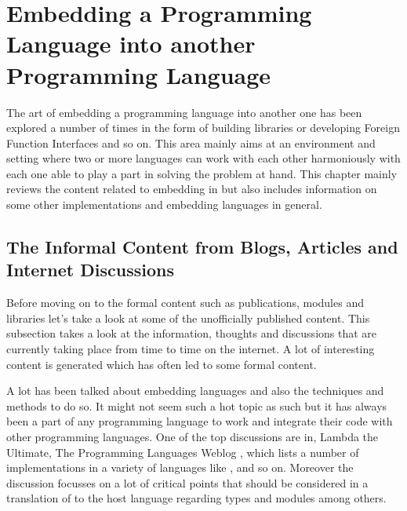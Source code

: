 \documentclass[thesis-solanki.tex]{subfiles}
\begin{document}
\chapter{Embedding a Programming Language into another Programming Language }\label{chap:embedding}

The art of embedding a programming language into another one has been explored a number of times in the form 
of building libraries or developing Foreign Function Interfaces and so on. This area mainly aims at an environment 
and setting where two or more languages can work with each other harmoniously with each one able to play a part 
in solving the problem at hand. This chapter mainly reviews the content related to embedding  in 
 but also includes information on some other implementations and embedding languages in 
general.          


\section{The Informal Content from Blogs, Articles and Internet Discussions}

Before moving on to the formal content such as publications, modules and libraries let's take a look at some of 
the unofficially published content. This subsection takes a look at the information, thoughts and discussions that 
are currently taking place from time to time on the internet. A lot of interesting content is generated which has 
often led to some formal content.   

\par A lot has been talked about embedding languages and also the techniques and methods to do so. It might not 
seem such a hot topic as such but it has always been a part of any programming language to work and integrate 
their code with other programming languages. One of the top discussions are in, Lambda the Ultimate, The 
Programming Languages Weblog \cite{website:lambda-the-ultimate},  which lists a number of  
implementations in a variety of languages like , 
 \cite{racklog} and so on. Moreover the discussion focusses on a lot of critical points that should 
be considered in a translation of  to the host language regarding types and modules among 
others. 
\end{document}
